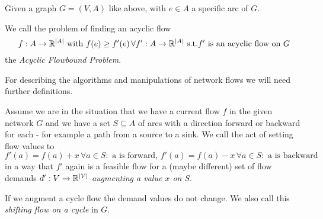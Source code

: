 \begin{definition}
  Given a graph $G=(V,A)$ like above, with $e \in A$ a specific arc of $G$. 
  
We call the problem of finding an acyclic flow 
$$f:A\to\mathbb{R}^{|A|}\textrm{ with }f(e)\ge f'(e)\,\forall f':A\to\mathbb{R}^{|A|}\textrm{ s.t.} f'\textrm{ is an acyclic flow on 
}G$$
  the \textit{ Acyclic Flowbound Problem}.
\end{definition}

For describing the algorithms and manipulations of network flows we will need further definitions. 
\begin{definition}
 Assume we are in the situation that we  have a current flow $f$ in the given network $G$ and we have a set 
$S\subseteq A$ of arcs with a direction forward or backward for each - for example a path from a source to a sink. We 
call the act of setting flow values to
$$f'(a)= f(a)+x \,\forall a\in S:\textrm{ a is forward, }f'(a)= f(a)-x \,\forall a\in S:\textrm{ a is backward}$$
in a way that $f'$ again is a feasible flow for a (maybe different) set of flow demands $d':V\to\mathbb{R}^{|V|}$ 
\textit{ augmenting a value $x$ on $S$}. 

If we augment a cycle flow the demand values do not change. We also call this \textit{shifting flow on a cycle} in $G$.

\end{definition}


